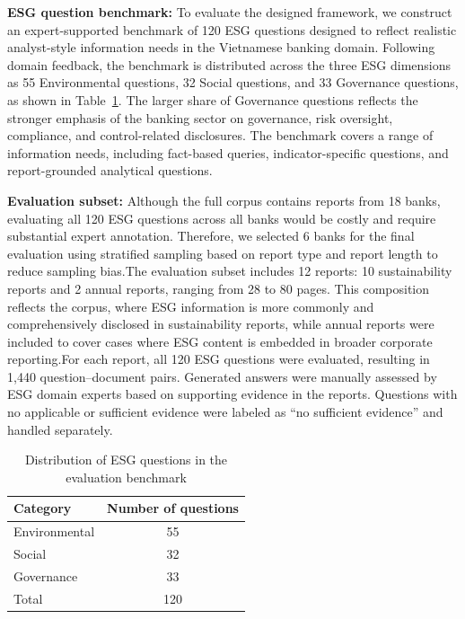 \documentclass[sn-mathphys, oneside]{sn-jnl}
\begin{document}
\textbf{ESG question benchmark:} To evaluate the designed framework, we construct an expert-supported benchmark of
120 ESG questions designed to reflect realistic analyst-style information needs in the
Vietnamese banking domain. Following domain feedback, the benchmark is distributed
across the three ESG dimensions as 55 Environmental questions, 32 Social questions,
and 33 Governance questions, as shown in Table~\ref{tab:question_distribution}.
The larger share of Governance questions reflects the stronger emphasis of the banking
sector on governance, risk oversight, compliance, and control-related disclosures.
The benchmark covers a range of information needs, including fact-based queries,
indicator-specific questions, and report-grounded analytical questions.


\textbf{Evaluation subset:} Although the full corpus contains reports from 18 banks, evaluating all 120 ESG questions across all banks would be costly and require substantial expert annotation. Therefore, we selected 6 banks for the final evaluation using stratified sampling based on report type and report length to reduce sampling bias.The evaluation subset includes 12 reports: 10 sustainability reports and 2 annual reports, ranging from 28 to 80 pages. This composition reflects the corpus, where ESG information is more commonly and comprehensively disclosed in sustainability reports, while annual reports were included to cover cases where ESG content is embedded in broader corporate reporting.For each report, all 120 ESG questions were evaluated, resulting in 1,440 question–document pairs. Generated answers were manually assessed by ESG domain experts based on supporting evidence in the reports. Questions with no applicable or sufficient evidence were labeled as “no sufficient evidence” and handled separately.



\begin{table}[htbp]
\centering
\caption{Distribution of ESG questions in the evaluation benchmark}
\label{tab:question_distribution}
\begin{tabular}{lc}
\toprule
\textbf{Category} & \textbf{Number of questions} \\
\midrule
Environmental & 55 \\
Social & 32 \\
Governance & 33 \\
\midrule
Total & 120 \\
\bottomrule
\end{tabular}
\end{table}
\end{document}
